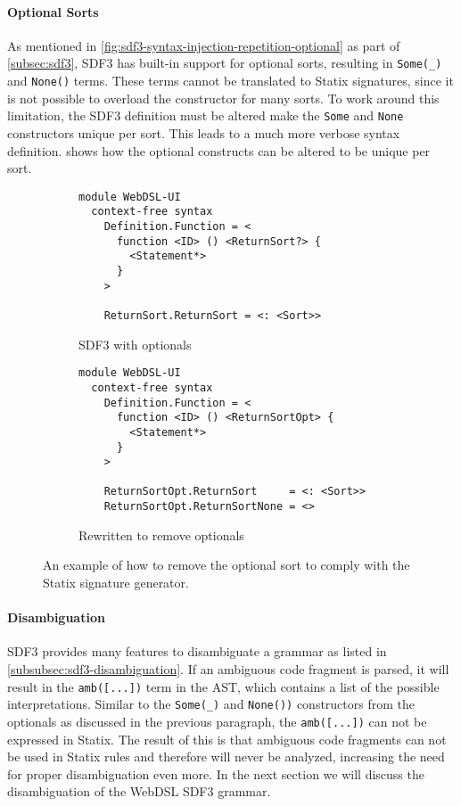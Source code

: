       \paragraph{\label{par:optional-sorts}Optional Sorts} As mentioned in \cref{fig:sdf3-syntax-injection-repetition-optional} as part of \cref{subsec:sdf3}, SDF3 has built-in support for optional sorts, resulting in \texttt{Some(\_)} and \texttt{None()} terms. These terms cannot be  translated to Statix signatures, since it is not possible to overload the constructor for many sorts. To work around this limitation, the SDF3 definition must be altered make the \texttt{Some} and \texttt{None} constructors unique per sort. This leads to a much more verbose syntax definition.  shows how the optional constructs can be altered to be unique per sort.

      \begin{figure}
        \begin{subfigure}[b]{1\textwidth}
          \begin{verbatim}
module WebDSL-UI
  context-free syntax
    Definition.Function = <
      function <ID> () <ReturnSort?> {
        <Statement*>
      }
    >

    ReturnSort.ReturnSort = <: <Sort>>
          \end{verbatim}
          \caption{\label{fig:sdf3-remove-optionals-before}SDF3 with optionals}
        \end{subfigure}
        \begin{subfigure}[b]{1\textwidth}
          \begin{verbatim}
module WebDSL-UI
  context-free syntax
    Definition.Function = <
      function <ID> () <ReturnSortOpt> {
        <Statement*>
      }
    >

    ReturnSortOpt.ReturnSort     = <: <Sort>>
    ReturnSortOpt.ReturnSortNone = <>
          \end{verbatim}
          \caption{\label{fig:sdf3-remove-optionals-after}Rewritten to remove optionals}
        \end{subfigure}
      \caption{\label{fig:sdf3-remove-optionals}An example of how to remove the optional sort to comply with the Statix signature generator.}
      \end{figure}

      \paragraph{Disambiguation} SDF3 provides many features to disambiguate a grammar as listed in \cref{subsubsec:sdf3-disambiguation}. If an ambiguous code fragment is parsed, it will result in the \texttt{amb([...])} term in the AST, which contains a list of the possible interpretations. Similar to the \texttt{Some(\_)} and \texttt{None())} constructors from the optionals as discussed in the previous paragraph, the \texttt{amb([...])} can not be expressed in Statix. The result of this is that ambiguous code fragments can not be used in Statix rules and therefore will never be analyzed, increasing the need for proper disambiguation even more. In the next section we will discuss the disambiguation of the WebDSL SDF3 grammar.

